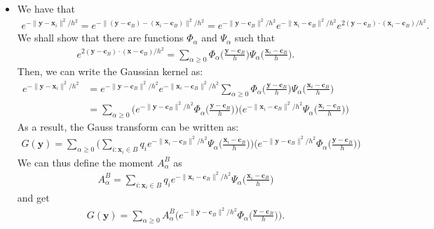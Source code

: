 \documentclass[10pt]{article}
\newcommand{\ve}[1]{\mathbf{#1}}
\begin{document}
\begin{itemize}
  \item We have that
  \begin{align*}
    e^{-\| \ve{y} - \ve{x}_i \|^2 / h^2}
    = e^{-\| (\ve{y} - \ve{c}_B) - (\ve{x}_i - \ve{c}_B) \|^2 / h^2}
    = e^{-\| \ve{y} - \ve{c}_B \|^2 / h^2} e^{-\| \ve{x}_i - \ve{c}_B \|^2 / h^2} e^{2 (\ve{y} - \ve{c}_B) \cdot (\ve{x}_i - \ve{c}_B) / h^2}.
  \end{align*}
  We shall show that there are functions $\Phi_\alpha$ and $\Psi_\alpha$ such that
  \begin{align*}
    e^{2 (\ve{y} - \ve{c}_B) \cdot (\ve{x} - \ve{c}_B) / h^2}
    = \sum_{\alpha \geq 0} \Phi_\alpha\bigg(\frac{\ve{y} - \ve{c}_B}{h}\bigg) \Psi_\alpha\bigg(\frac{\ve{x}_i - \ve{c}_B}{h}\bigg).
  \end{align*}
  Then, we can write the Gaussian kernel as:
  \begin{align*}
    e^{-\| \ve{y} - \ve{x}_i \|^2 / h^2}
    &= e^{-\| \ve{y} - \ve{c}_B \|^2 / h^2} e^{-\| \ve{x}_i - \ve{c}_B \|^2 / h^2} \sum_{\alpha \geq 0} \Phi_\alpha\bigg(\frac{\ve{y} - \ve{c}_B}{h}\bigg) \Psi_\alpha\bigg(\frac{\ve{x}_i - \ve{c}_B}{h}\bigg)\\
    &= \sum_{\alpha \geq 0} \bigg( e^{-\| \ve{y} - \ve{c}_B \|^2 / h^2} \Phi_\alpha\bigg(\frac{\ve{y} - \ve{c}_B}{h}\bigg) \bigg) \bigg( e^{-\| \ve{x}_i - \ve{c}_B \|^2 / h^2} \Psi_\alpha\bigg(\frac{\ve{x}_i - \ve{c}_B}{h}\bigg) \bigg)
  \end{align*}
  As a result, the Gauss transform can be written as:
  \begin{align*}
    G(\ve{y}) = \sum_{\alpha \geq 0} \bigg( \sum_{i:\ve{x}_i \in B} q_i e^{-\| \ve{x}_i - \ve{c}_B \|^2 / h^2} \Psi_\alpha\bigg(\frac{\ve{x}_i - \ve{c}_B}{h}\bigg) \bigg) \bigg( e^{-\| \ve{y} - \ve{c}_B \|^2 / h^2} \Phi_\alpha\bigg(\frac{\ve{y} - \ve{c}_B}{h}\bigg) \bigg)
  \end{align*}
  We can thus define the moment $A_\alpha^B$ as
  \begin{align*}
    A_\alpha^B = \sum_{i:\ve{x}_i \in B} q_i e^{-\| \ve{x}_i - \ve{c}_B \|^2 / h^2} \Psi_\alpha\bigg(\frac{\ve{x}_i - \ve{c}_B}{h}\bigg)
  \end{align*}
  and get
  \begin{align*}
    G(\ve{y}) = \sum_{\alpha \geq 0} A_\alpha^B \bigg( e^{-\| \ve{y} - \ve{c}_B \|^2 / h^2} \Phi_\alpha\bigg(\frac{\ve{y} - \ve{c}_B}{h}\bigg) \bigg).
  \end{align*}
  

\end{itemize}
\end{document}
